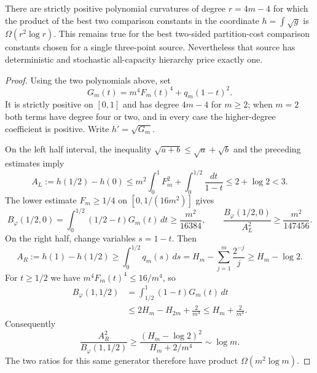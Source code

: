 \begin{proposition}
\label{prop:coordinate-same-source}
There are strictly positive polynomial curvatures of degree $r=4m-4$
for which the product of the best two comparison constants in the
coordinate $h=\int\sqrt g$ is $\Omega(r^2\log r)$. This remains true
for the best two-sided partition-cost comparison constants chosen for a
single three-point source. Nevertheless that source has deterministic
and stochastic all-capacity hierarchy price exactly one.
\end{proposition}
\begin{proof}
Using the two polynomials above, set
\[
 G_m(t)=m^4F_m(t)^4+q_m(1-t)^2.
\]
It is strictly positive on $[0,1]$ and has degree $4m-4$ for $m\geq2$;
when $m=2$ both terms have degree four or two, and in every case the
higher-degree coefficient is positive. Write $h'=\sqrt{G_m}$.

On the left half interval, the inequality
$\sqrt{a+b}\leq\sqrt a+\sqrt b$ and the preceding estimates imply
\[
 A_L:=h(1/2)-h(0)
 \leq m^2\int_0^1F_m^2+\int_0^{1/2}\frac{dt}{1-t}
 \leq2+\log2<3.
\]
The lower estimate $F_m\geq1/4$ on $[0,1/(16m^2)]$ gives
\[
 B_\varphi(1/2,0)
 =\int_0^{1/2}(1/2-t)G_m(t)\,dt
 \geq\frac{m^2}{16384},\qquad
 \frac{B_\varphi(1/2,0)}{A_L^2}\geq\frac{m^2}{147456}.
\]
On the right half, change variables $s=1-t$. Then
\[
 A_R:=h(1)-h(1/2)
 \geq\int_0^{1/2}q_m(s)\,ds
 =H_m-\sum_{j=1}^m\frac{2^{-j}}j\geq H_m-\log2.
\]
For $t\geq1/2$ we have $m^4F_m(t)^4\leq16/m^4$, so
\[
 \begin{split}
 B_\varphi(1,1/2)
 &=\int_{1/2}^1(1-t)G_m(t)\,dt\\
 &\leq 2H_m-H_{2m}+\frac2{m^4}
 \leq H_m+\frac2{m^4}.
 \end{split}
\]
Consequently
\[
 \frac{A_R^2}{B_\varphi(1,1/2)}
 \geq\frac{(H_m-\log2)^2}{H_m+2/m^4}\sim\log m.
\]
The two ratios for this same generator therefore have product
$\Omega(m^2\log m)$.


\end{proof}
